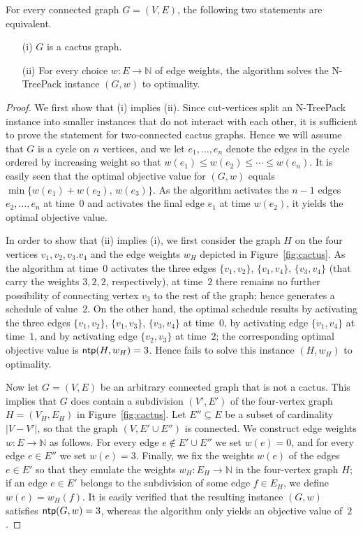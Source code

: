 \documentclass[runningheads]{llncs}
\newcommand{\N}{\mathbb{N}}
\DeclareMathOperator{\ntp}{\text{\sf ntp}}
\newcommand{\xxxNTP}{{\sc N-TreePack}}
\newcommand{\greedy}{\text{\sf Greedy}}
\begin{document}
\begin{theorem}
\label{th:greedy.cactus}
For every connected graph $G=(V,E)$, the following two statements are equivalent.
\begin{itemize}
\item[(i)]  $G$ is a cactus graph.
\item[(ii)] For every choice $w:E\to\N$ of edge weights, the {\greedy} algorithm 
solves the {\xxxNTP} instance $(G,w)$ to optimality.
\end{itemize}
\end{theorem}
\begin{proof}
We first show that (i) implies (ii).
Since cut-vertices split an {\xxxNTP} instance into smaller instances that do not interact 
with each other, it is sufficient to prove the statement for two-connected cactus graphs.
Hence we will assume that $G$ is a cycle on $n$ vertices, and we let $e_1,\ldots,e_n$ 
denote the edges in the cycle ordered by increasing weight so that 
$w(e_1)\le w(e_2)\le\cdots\le w(e_n)$.
It is easily seen that the optimal objective value for $(G,w)$ equals 
$\min\{w(e_1)+w(e_2),\,w(e_3)\}$.
As the {\greedy} algorithm activates the $n-1$ edges $e_2,\ldots,e_n$ at time~$0$ and 
activates the final edge $e_1$ at time $w(e_2)$, it yields the optimal objective value.

In order to show that (ii) implies (i), we first consider the graph $H$ on the four
vertices $v_1,v_2,v_3.v_4$ and the edge weights $w_H$ depicted in Figure~\ref{fig:cactus}.
As the {\greedy} algorithm at time~$0$ activates the three edges $\{v_1,v_2\}$, $\{v_1,v_4\}$, 
$\{v_3,v_4\}$ (that carry the weights $3,2,2$, respectively), at time~$2$ there remains no 
further possibility of connecting vertex $v_3$ to the rest of the graph; hence {\greedy} 
generates a schedule of value~$2$.
On the other hand, the optimal schedule results by activating the three edges $\{v_1,v_2\}$, 
$\{v_1,v_3\}$, $\{v_3,v_4\}$ at time~$0$, by activating edge $\{v_1,v_4\}$ at time~$1$,
and by activating edge $\{v_2,v_3\}$ at time~$2$; the corresponding optimal objective
value is $\ntp(H,w_H)=3$.
Hence {\greedy} fails to solve this instance $(H,w_H)$ to optimality.

Now let $G=(V,E)$ be an arbitrary connected graph that is not a cactus. 
This implies that $G$ does contain a subdivision $(V',E')$ of the four-vertex 
graph $H=(V_H,E_H)$ in Figure~\ref{fig:cactus}.
Let $E''\subseteq E$ be a subset of cardinality $|V-V'|$, so that the graph $(V,E'\cup E'')$
is connected.
We construct edge weights $w:E\to\N$ as follows.
For every edge $e\notin E'\cup E''$ we set $w(e)=0$, and
for every edge $e\in E''$ we set $w(e)=3$.
Finally, we fix the weights $w(e)$ of the edges $e\in E'$ so that they emulate the 
weights $w_H:E_H\to\N$ in the four-vertex graph $H$; if an edge $e\in E'$ belongs to the 
subdivision of some edge $f\in E_H$, we define $w(e)=w_H(f)$.
It is easily verified that the resulting instance $(G,w)$ satisfies $\ntp(G,w)=3$,
whereas the {\greedy} algorithm only yields an objective value of~$2$.
\end{proof}
\end{document}
